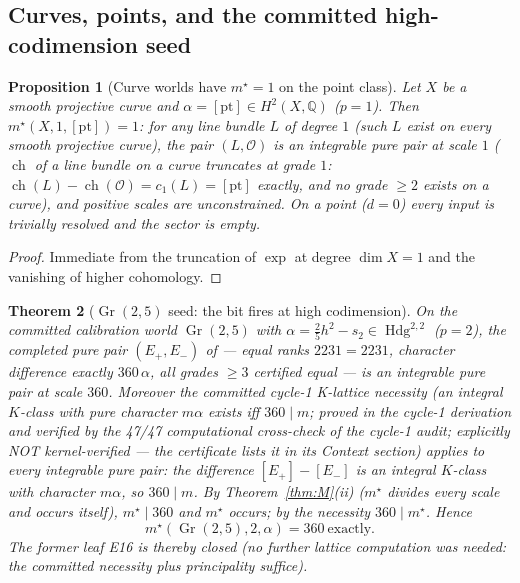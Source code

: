 \documentclass[11pt]{article}
\newtheorem{theorem}{Theorem}[section]
\newtheorem{proposition}[theorem]{Proposition}
\newcommand{\ch}{\operatorname{ch}}
\newcommand{\Oo}{\mathcal{O}}
\newcommand{\Hdg}{\operatorname{Hdg}}
\newcommand{\Q}{\mathbb{Q}}
\newcommand{\Gr}{\operatorname{Gr}}
\begin{document}
\subsection{Curves, points, and the committed high-codimension seed}

\begin{proposition}[Curve worlds have $m^\star=1$ on the point class]
\label{prop:curve}
Let $X$ be a smooth projective curve and $\alpha=[\mathrm{pt}]\in H^2(X,\Q)$
($p=1$).  Then $m^\star(X,1,[\mathrm{pt}])=1$: for any line bundle $L$ of
degree $1$ (such $L$ exist on every smooth projective curve), the pair
$(L,\Oo)$ is an integrable pure pair at scale $1$ ($\ch$ of a line bundle on
a curve truncates at grade $1$: $\ch(L)-\ch(\Oo)=c_1(L)=[\mathrm{pt}]$
exactly, and no grade $\ge2$ exists on a curve), and positive scales are
unconstrained.
On a point ($d=0$) every input is trivially resolved and the sector is
empty.
\end{proposition}

\begin{proof}
Immediate from the truncation of $\exp$ at degree $\dim X=1$ and the
vanishing of higher cohomology.
\end{proof}

\begin{theorem}[$\Gr(2,5)$ seed: the bit fires at high codimension]
\label{thm:grseed}
On the committed calibration world $\Gr(2,5)$ with
$\alpha=\frac25h^2-s_2\in\Hdg^{2,2}$ ($p=2$), the completed pure pair
$(E_+,E_-)$ of \cite{GST-gr25} --- equal ranks $2231=2231$, character
difference exactly $360\,\alpha$, all grades $\ge3$ certified equal ---
is an integrable pure pair at scale $360$.  Moreover the committed cycle-1
K-lattice \emph{necessity} (an integral $K$-class with pure character
$m\alpha$ exists iff $360\mid m$; proved in the cycle-1 derivation and
verified by the 47/47 computational cross-check of the cycle-1 audit;
explicitly NOT kernel-verified --- the certificate lists it in its Context
section) applies to every integrable pure pair: the difference
$[E_+]-[E_-]$ is an integral $K$-class with character $m\alpha$, so
$360\mid m$.  By Theorem~\ref{thm:M}(ii) ($m^\star$ divides every scale
and occurs itself), $m^\star\mid 360$ and $m^\star$ occurs; by the
necessity $360\mid m^\star$.  Hence
\[
\boxed{\;m^\star(\Gr(2,5),2,\alpha)=360\ \text{exactly}.\;}
\]
The former leaf E16 is thereby \emph{closed} (no further lattice computation
was needed: the committed necessity plus principality suffice).
\end{theorem}
\end{document}
